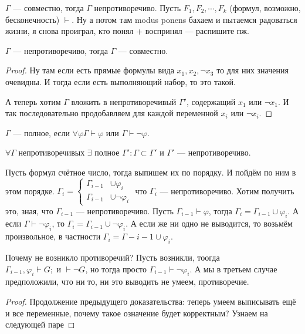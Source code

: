 \begin{statement}
	$\Gamma$ --- совместно, тогда $\Gamma$ непротиворечиво. Пусть $F_1, F_2, \cdots, F_k$ (формул, возможно, бесконечность) $\vdash$. Ну а потом там modus ponens бахаем и пытаемся радоваться жизни, я снова проиграл, кто понял + воспринял --- распишите пж.
\end{statement}
\begin{statement}
	$\Gamma$ --- непротиворечиво, тогда $\Gamma$ --- совместно. 
\end{statement}
\begin{proof}
	Ну там если есть прямые формулы вида $x_1, x_2, \lnot x_3$ то для них значения очевидны. И тогда если есть выполняющий набор, то это такой.

	А теперь хотим $\Gamma$ вложить в непротиворечивый $\Gamma'$, содержащий $x_1$ или $\lnot x_1$. И так последовательно продобавляем для каждой переменной $x_i$ или $\lnot x_i$. 
\end{proof}
\begin{definition}
	$\Gamma$ --- полное, если $\forall \varphi \Gamma \vdash \varphi$ или $\Gamma \vdash \lnot \varphi$.
\end{definition}
\begin{statement}
	$\forall \Gamma $ непротиворечивых $\exists$ полное $\Gamma': \Gamma \subset \Gamma'$ и $\Gamma'$ --- непротиворечиво.

	Пусть формул счётное число, тогда выпишем их по порядку. И пойдём по ним в этом порядке. $\Gamma_{i} = \left\{ \begin{aligned} \Gamma_{i-1} &\cup \varphi_i \\ \Gamma_{i-1} &\cup \lnot \varphi_i \end{aligned} \right.$ что $\Gamma_{i}$ --- непротиворечиво. Хотим получить это, зная, что $\Gamma_{i-1}$ --- непротиворечиво. Пусть $\Gamma_{i-1} \vdash \varphi$, тогда $\Gamma_i = \Gamma_{i-1} \cup \varphi_i$. А если $\Gamma \vdash \lnot \varphi_i$, то $\Gamma_i = \Gamma_{i-1} \cup \lnot \varphi_i$. А если же ни одно не выводится, то возьмём произвольное, в частности $\Gamma_i = \Gamma-{i-1} \cup \varphi_i$. 

	Почему не возникло противоречий? Пусть возникли, тоогда $\Gamma_{i-1}, \varphi_i \vdash G; \text{ и } \vdash \lnot G$, но тогда просто $\Gamma_{i-1} \vdash \lnot \varphi_i$. А мы в третьем случае предположили, что ни то, ни это выводить не умеем, противоречие. 
\end{statement}

\begin{proof}
	Продолжение предыдущего доказательства: теперь умеем выписывать ещё и все переменные, почему такое означение будет корректным? Узнаем на следующей паре
\end{proof}


